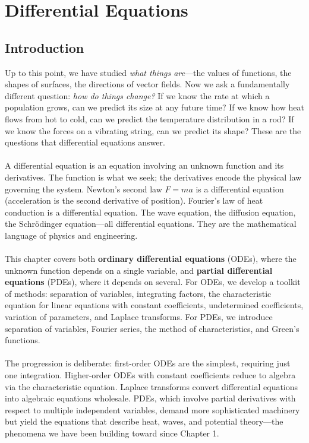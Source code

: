 
\chapter{Differential Equations}

\section*{Introduction}

Up to this point, we have studied \textit{what things are}---the values of functions, the shapes of surfaces, the directions of vector fields. Now we ask a fundamentally different question: \textit{how do things change?} If we know the rate at which a population grows, can we predict its size at any future time? If we know how heat flows from hot to cold, can we predict the temperature distribution in a rod? If we know the forces on a vibrating string, can we predict its shape? These are the questions that differential equations answer.\\ \\
\noindent A differential equation is an equation involving an unknown function and its derivatives. The function is what we seek; the derivatives encode the physical law governing the system. Newton's second law \( F = ma \) is a differential equation (acceleration is the second derivative of position). Fourier's law of heat conduction is a differential equation. The wave equation, the diffusion equation, the Schr\"odinger equation---all differential equations. They are the mathematical language of physics and engineering.\\ \\
\noindent This chapter covers both \textbf{ordinary differential equations} (ODEs), where the unknown function depends on a single variable, and \textbf{partial differential equations} (PDEs), where it depends on several. For ODEs, we develop a toolkit of methods: separation of variables, integrating factors, the characteristic equation for linear equations with constant coefficients, undetermined coefficients, variation of parameters, and Laplace transforms. For PDEs, we introduce separation of variables, Fourier series, the method of characteristics, and Green's functions.\\ \\
\noindent The progression is deliberate: first-order ODEs are the simplest, requiring just one integration. Higher-order ODEs with constant coefficients reduce to algebra via the characteristic equation. Laplace transforms convert differential equations into algebraic equations wholesale. PDEs, which involve partial derivatives with respect to multiple independent variables, demand more sophisticated machinery but yield the equations that describe heat, waves, and potential theory---the phenomena we have been building toward since Chapter 1.



